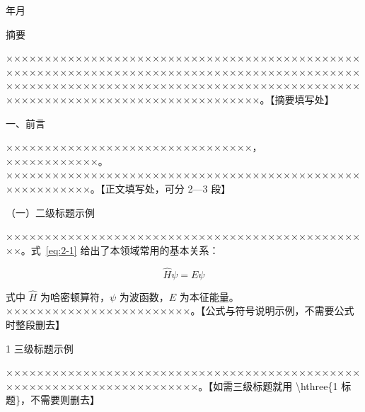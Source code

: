 \documentclass[12pt,a4paper,fontset=fandol]{ctexart}
\newcommand{\hone}[1]{%
  \par\vspace{2\baselineskip}%
  {\centering\heiti\zihao{3}#1\par}%
  \vspace{1.4\baselineskip}}
\newcommand{\htwo}[1]{%
  \par\vspace{1.5\baselineskip}%
  {\heiti\zihao{-3}#1\par}%
  \vspace{0.8\baselineskip}}
\newcommand{\hthree}[1]{%
  \par\vspace{1\baselineskip}%
  {\heiti\zihao{4}#1\par}%
  \vspace{0.4\baselineskip}}
\newcommand{\eqn}[2]{%
  \begin{equation}\label{eq:#2}
    #1 \tag{#2}
  \end{equation}}
\begin{document}
\begin{center}
  {\heiti 年\hspace{2.6em}月}
\end{center}

\clearpage
\pagestyle{fancy}
\linespread{1.5}\selectfont

\begin{center}
  {\heiti{} 摘\quad 要}
\end{center}
\vspace{0.6\baselineskip}

×××××××××××××××××××××××××××××××××××××××××××××××××××××××××××××××××××××××××××××××××××××××××××××××××××××××××××××××××××××××××××××××××××××××××××××××××××××××××××××××××××××××××××。【摘要填写处】

\vspace{0.3\baselineskip}

\hone{一、前言}

××××××××××××××××××××××××××××××××，××××××××××××\cite{exampleZh}。×××××××××××××××××××××××××××××××××××××××××××××××××××××××××。【正文填写处，可分 2—3 段】

\htwo{（一）二级标题示例}

××××××××××××××××××××××××××××××××××××××××××××××××。式~\eqref{eq:2-1} 给出了本领域常用的基本关系\cite{exampleEn}：

\eqn{\hat{H}\psi = E\psi}{2-1}

式中 $\hat{H}$ 为哈密顿算符，$\psi$ 为波函数，$E$ 为本征能量。××××××××××××××××××××××××。【公式与符号说明示例，不需要公式时整段删去】

\hthree{1  三级标题示例}

×××××××××××××××××××××××××××××××××××××××××××××××××××××××××××××××××××××××。【如需三级标题就用 \textbackslash hthree\{1 标题\}，不需要则删去】
\end{document}
